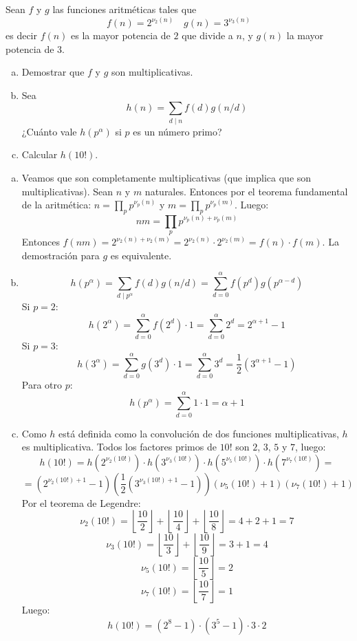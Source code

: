 \documentclass[twoside]{article}
\begin{document}
\newpage

\begin{ejercicio}{2}
Sean $f$ y $g$ las funciones aritméticas tales que
\[ f(n) = 2^{ν_2(n)} \quad g(n) = 3^{ν_3(n)} \]
es decir $f(n)$ es la mayor potencia de $2$ que divide a $n$, y $g(n)$ la mayor potencia de $3$.
\begin{enumerate}[(a)]
\item Demostrar que $f$ y $g$ son multiplicativas.
\item Sea
\[ h(n) = \sum_{d \mid n} f(d) g(n/d) \]
¿Cuánto vale $h(p^α)$ si $p$ es un número primo?
\item Calcular $h(10!)$.
\end{enumerate}
\end{ejercicio}
\begin{solucion}
\begin{enumerate}[(a)]
\item Veamos que son completamente multiplicativas (que implica que son multiplicativas). Sean $n$ y $m$ naturales.
Entonces por el teorema fundamental de la aritmética: $n = \prod_p p^{ν_p(n)}$ y $m = \prod_p p^{ν_p(m)}$. Luego:
\[ nm = \prod_p p^{ν_p(n)+ν_p(m)}\]
Entonces $f(nm)=2^{ν_2(n)+ν_2(m)}=2^{ν_2(n)}\cdot 2^{ν_2(m)} = f(n)\cdot f(m)$. La demostración para $g$ es equivalente.
\item
\[ h(p^α) = \sum_{d \mid p^α} f(d) g(n/d) = \sum_{d=0}^{α} f(p^d) g(p^{α-d}) \]
Si $p=2$:
\[ h(2^α) = \sum_{d=0}^α f(2^d)\cdot 1 = \sum_{d=0}^α 2^d = 2^{α+1}-1 \]
Si $p=3$:
\[ h(3^α) = \sum_{d=0}^α g(3^d)\cdot 1 = \sum_{d=0}^α 3^d = \frac{1}{2}(3^{α+1}-1)\]
Para otro $p$:
\[ h(p^α) = \sum_{d=0}^α 1\cdot 1 = α+1\]

\item Como $h$ está definida como la convolución de dos funciones multiplicativas, $h$ es multiplicativa.
Todos los factores primos de $10!$ son $2$, $3$, $5$ y $7$, luego:
\[ h(10!) = h(2^{ν_2(10!)})\cdot h(3^{ν_3(10!)}) \cdot h(5^{ν_5(10!)}) \cdot h(7^{ν_7(10!)}) = \]
\[ = (2^{ν_2(10!)+1}-1)\left(\frac{1}{2}\left(3^{ν_3(10!)+1}-1\right)\right)(ν_5(10!)+1)(ν_7(10!)+1) \]
Por el teorema de Legendre:
\[ ν_2(10!) = \left\lfloor \frac{10}{2}\right\rfloor + \left\lfloor \frac{10}{4}\right\rfloor + \left\lfloor \frac{10}{8}\right\rfloor = 4+2+1=7 \]
\[ ν_3(10!) = \left\lfloor \frac{10}{3}\right\rfloor + \left\lfloor \frac{10}{9}\right\rfloor = 3+1 = 4 \]
\[ ν_5(10!) = \left\lfloor \frac{10}{5}\right\rfloor = 2 \]
\[ ν_7(10!) = \left\lfloor \frac{10}{7}\right\rfloor = 1 \]
Luego:
\[ h(10!) = (2^8-1)\cdot (3^5-1)\cdot 3 \cdot 2 \]


\end{enumerate}
\end{solucion}
\end{document}
